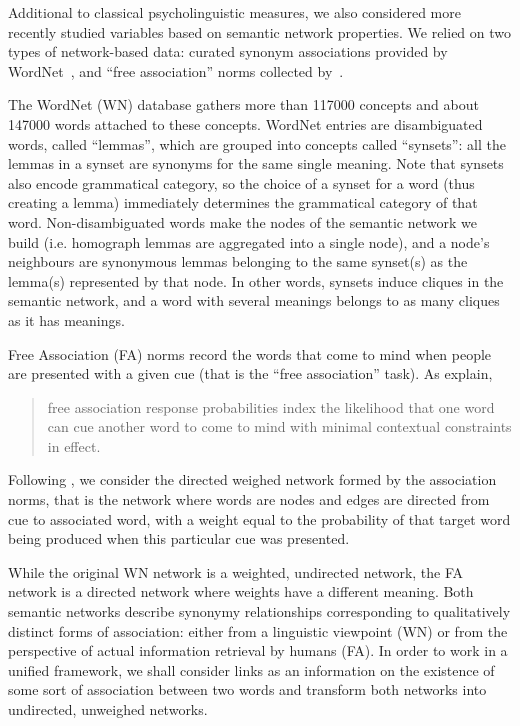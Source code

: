 Additional to classical psycholinguistic measures, we also considered more recently studied variables based on semantic network properties.
We relied on two types of network-based data: curated synonym associations provided by WordNet~\citep{WordNet10}, and ``free association'' norms collected by~\citet{Nelson04}.  

The WordNet (WN) database gathers more than \num{117000} concepts and about \num{147000} words attached to these concepts.
WordNet entries are disambiguated words, called ``lemmas'', which are grouped into concepts called ``synsets'': all the lemmas in a synset are synonyms for the same single meaning.
Note that synsets also encode grammatical category, so the choice of a synset for a word (thus creating a lemma) immediately determines the grammatical category of that word.
Non-disambiguated words make the nodes of the semantic network we build (i.e. homograph lemmas are aggregated into a single node), and a node's neighbours are synonymous lemmas belonging to the same synset(s) as the lemma(s) represented by that node.
In other words, synsets induce cliques in the semantic network, and a word with several meanings belongs to as many cliques as it has meanings.

Free Association (FA) norms record the words that come to mind when people are presented with a given cue (that is the ``free association'' task).
As \citeauthor{Nelson04} explain,
\begin{quote}
free association response probabilities index the likelihood that one word can cue another word to come to mind with minimal contextual constraints in effect.~\citep{Nelson04}
\end{quote}
Following \citet{Griffiths07}, we consider the directed weighed network formed by the association norms, that is the network where words are nodes and edges are directed from cue to associated word, with a weight equal to the probability of that target word being produced when this particular cue was presented.

While the original WN network is a weighted, undirected network, the FA network is a directed network where weights have a different meaning.
Both semantic networks describe synonymy relationships corresponding to qualitatively distinct forms of association: either from a linguistic viewpoint (WN) or from the perspective of actual information retrieval by humans (FA).
In  order to work in a unified framework, we shall consider links as an information on the existence of some sort of association between two words and transform both networks into undirected, unweighed networks.

